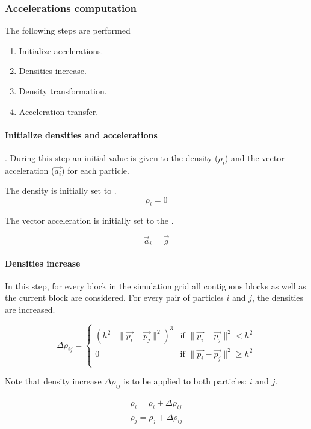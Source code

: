 \subsubsection{Accelerations computation}

The following steps are performed

\begin{enumerate}
\item Initialize accelerations.
\item Densities increase.
\item Density transformation.
\item Acceleration transfer.
\end{enumerate}

\paragraph{Initialize densities and accelerations}.
During this step an initial value is given to the density ($\rho_i$) and the
vector acceleration ($\vec{a_i}$) for each particle.

The density is initially set to .
\[
\rho_i = 0
\]

The vector acceleration is initially set to the .

\[
\vec{a}_i = \vec{g}
\]

\paragraph{Densities increase}
In this step, for every block in the simulation grid all contiguous blocks as
well as the current block are considered. For every pair of particles $i$ and
$j$, the densities are increased.

\[
\Delta \rho_{ij} = 
    \begin{cases}
      (h^2 - \|\vec{p_i} - \vec{p_j}\|^2)^3 & 
          \text{if  } \|\vec{p_i} - \vec{p_j}\|^2 < h^2\\
      0 & 
          \text{if  } \|\vec{p_i} - \vec{p_j}\|^2 \geq h^2\\
    \end{cases}
\]

Note that density increase $\Delta \rho_{ij}$ is to be applied to both particles:
$i$ and $j$.

\[
\begin{split}
\rho_i = \rho_i + \Delta \rho_{ij}\\
\rho_j = \rho_j + \Delta \rho_{ij}\\
\end{split}
\]

